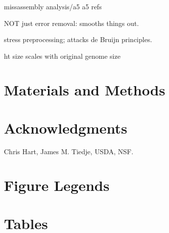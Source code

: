 \documentclass[10pt]{article}
\begin{document}
missassembly analysis/a5
a5 refs

NOT just error removal: smooths things out.

stress preprocessing; attacks de Bruijn principles.

ht size scales with original genome size


\section*{Materials and Methods}

\section*{Acknowledgments}

Chris Hart, James M. Tiedje, USDA, NSF.



\section*{Figure Legends}


\section*{Tables}
\end{document}
